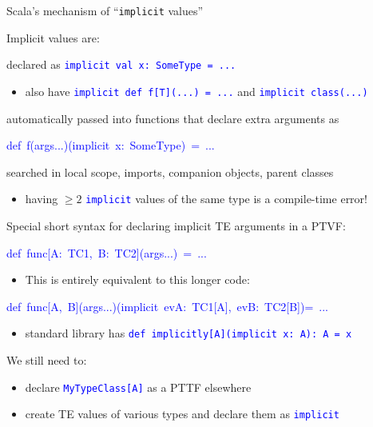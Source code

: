 \documentclass[english]{beamer}
\newenvironment{lyxcode}
   {\par\begin{list}{}{
     \setlength{\rightmargin}{\leftmargin}
     \setlength{\listparindent}{0pt}%
     \raggedright
     \setlength{\itemsep}{0pt}
     \setlength{\parsep}{0pt}
     \normalfont\ttfamily}%
    \def\{{\char`\{}
    \def\}{\char`\}}
    \def\textasciitilde{\char`\~}
    \item[]}
   {\end{list}}
\begin{document}
\begin{frame}{Scala's mechanism of ``\texttt{implicit} values''}

Implicit values are:
\begin{itemize}
\item declared as \texttt{\textcolor{blue}{\footnotesize{}implicit val x:\ SomeType
= ...}}{\footnotesize \par}
\begin{itemize}
\item also have \texttt{\textcolor{blue}{\footnotesize{}implicit def f{[}T{]}(...)\ =
...}} and \texttt{\textcolor{blue}{\footnotesize{}implicit class(...)}}{\footnotesize \par}
\end{itemize}
\item automatically passed into functions that declare extra arguments as
\begin{lyxcode}
\textcolor{blue}{\footnotesize{}def~f(args...)(implicit~x:~SomeType)~=~...}{\footnotesize \par}
\end{lyxcode}
\item searched in local scope, imports, companion objects, parent classes
\begin{itemize}
\item having $\geq2$ \texttt{\textcolor{blue}{\footnotesize{}implicit}}
values of the same type is a compile-time error!
\end{itemize}
\end{itemize}
Special short syntax for declaring implicit TE arguments in a PTVF:
\begin{lyxcode}
\textcolor{blue}{\footnotesize{}def~func{[}A:~TC1,~B:~TC2{]}(args...)~=~...}{\footnotesize \par}
\end{lyxcode}
\begin{itemize}
\item This is entirely equivalent to this longer code:
\end{itemize}
\begin{lyxcode}
\textcolor{blue}{\footnotesize{}def~func{[}A,~B{]}(args...)(implicit~evA:~TC1{[}A{]},~evB:~TC2{[}B{]})=~...}{\footnotesize \par}
\end{lyxcode}
\begin{itemize}
\item standard library has \texttt{\textcolor{blue}{\footnotesize{}def implicitly{[}A{]}(implicit
x:\ A):\ A = x}}{\footnotesize \par}
\end{itemize}
We still need to:
\begin{itemize}
\item declare \texttt{\textcolor{blue}{\footnotesize{}MyTypeClass{[}A{]}}}
as a PTTF elsewhere
\item create TE values of various types and declare them as \texttt{\textcolor{blue}{\footnotesize{}implicit}}
\ 
\end{itemize}
\end{frame}
\end{document}
